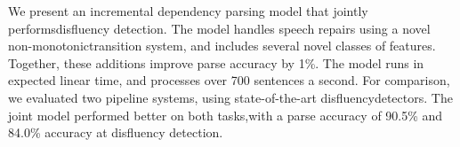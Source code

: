 We present an incremental dependency parsing model that jointly performsdisfluency detection.  The model handles speech repairs using a novel non-monotonictransition system, and includes several novel classes of features. Together, these additions improve parse accuracy by 1\%.  The model runs in expected linear time, and processes over 700 sentences a second. For comparison, we evaluated two pipeline systems, using state-of-the-art disfluencydetectors.  The joint model performed better on both tasks,with a parse accuracy of 90.5\% and 84.0\% accuracy at disfluency detection.
